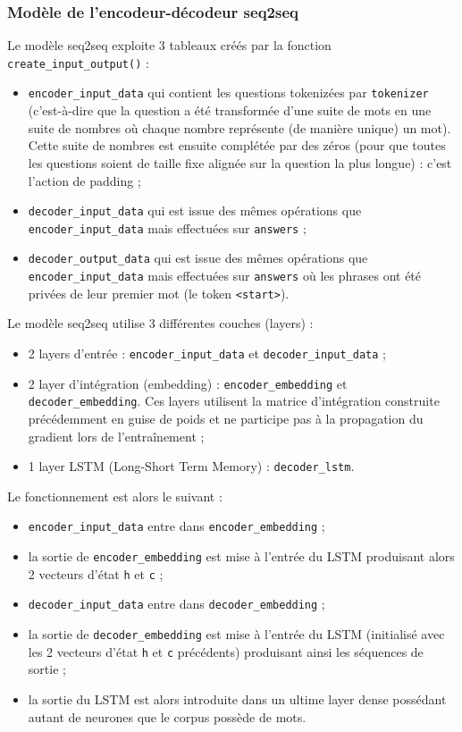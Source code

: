 \documentclass[10pt,a4paper]{article}
\newcommand\tab[1][0.5cm]{\hspace*{#1}}
\begin{document}
\subsubsection{Modèle de l'encodeur-décodeur seq2seq}
Le modèle seq2seq exploite 3 tableaux créés par la fonction \texttt{create\_input\_output()} :
\begin{itemize}
	\item \texttt{encoder\_input\_data} qui contient les questions tokenizées par \texttt{tokenizer} (c'est-à-dire que la question a été transformée d'une suite de mots en une suite de nombres où chaque nombre représente (de manière unique) un mot). Cette suite de nombres est ensuite complétée par des zéros (pour que toutes les questions soient de taille fixe alignée sur la question la plus longue) : c'est l'action de padding ;
	\item \texttt{decoder\_input\_data} qui est issue des mêmes opérations que \texttt{encoder\_input\_data} mais effectuées sur \texttt{answers} ;
	\item \texttt{decoder\_output\_data} qui est issue des mêmes opérations que \texttt{encoder\_input\_data} mais effectuées sur \texttt{answers} où les phrases ont été privées de leur premier mot (le token \texttt{<start>}).
\end{itemize}
\tab Le modèle seq2seq utilise 3 différentes couches (layers) :
\begin{itemize}
	\item 2 layers d'entrée : \texttt{encoder\_input\_data} et \texttt{decoder\_input\_data} ;
	\item 2 layer d'intégration (embedding) : \texttt{encoder\_embedding} et \texttt{decoder\_embedding}. Ces layers utilisent la matrice d'intégration construite précédemment en guise de poids et ne participe pas à la propagation du gradient lors de l'entraînement ;
	\item 1 layer LSTM (Long-Short Term Memory) : \texttt{decoder\_lstm}.
\end{itemize}
Le fonctionnement est alors le suivant :
\begin{itemize}
	\item \texttt{encoder\_input\_data} entre dans \texttt{encoder\_embedding} ;
	\item la sortie de \texttt{encoder\_embedding} est mise à l'entrée du LSTM produisant alors 2 vecteurs d'état \texttt{h} et \texttt{c} ;
	\item \texttt{decoder\_input\_data} entre dans \texttt{decoder\_embedding} ;
	\item la sortie de \texttt{decoder\_embedding} est mise à l'entrée du LSTM (initialisé avec les 2 vecteurs d'état \texttt{h} et \texttt{c} précédents) produisant ainsi les séquences de sortie ;
	\item la sortie du LSTM est alors introduite dans un ultime layer dense possédant autant de neurones que le corpus possède de mots.
\end{itemize}
\end{document}
